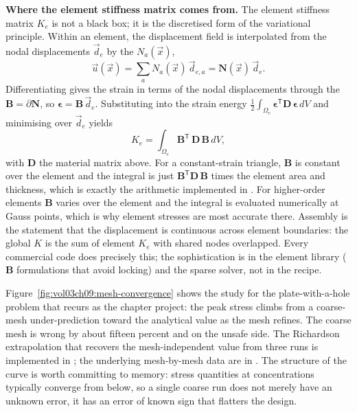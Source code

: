 \begin{mastery}
\textbf{Where the element stiffness matrix comes from.} The element
stiffness matrix $K_e$ is not a black box; it is the discretised form
of the variational principle. Within an element, the displacement field
is interpolated from the nodal displacements $\vec{d}_e$ by the
 $N_a(\vec{x})$,
\[
\vec{u}(\vec{x}) = \sum_a N_a(\vec{x})\,\vec{d}_{e,a}
= \mathbf{N}(\vec{x})\,\vec{d}_e .
\]
Differentiating gives the strain in terms of the nodal displacements
through the  $\mathbf{B} =
\partial \mathbf{N}$, so $\boldsymbol{\epsilon} = \mathbf{B}\,
\vec{d}_e$. Substituting into the strain energy
$\tfrac{1}{2}\int_{\Omega_e} \boldsymbol{\epsilon}^{\mathsf T}
\mathbf{D}\,\boldsymbol{\epsilon}\,dV$ and minimising over $\vec{d}_e$
yields
\[
K_e = \int_{\Omega_e} \mathbf{B}^{\mathsf T}\,\mathbf{D}\,\mathbf{B}
\,dV ,
\]
with $\mathbf{D}$ the material matrix above. For a constant-strain
triangle, $\mathbf{B}$ is constant over the element and the integral is
just $\mathbf{B}^{\mathsf T}\mathbf{D}\,\mathbf{B}$ times the element
area and thickness, which is exactly the arithmetic implemented in
. For higher-order elements $\mathbf{B}$
varies over the element and the integral is evaluated numerically at
Gauss points, which is why element stresses are most accurate there.
Assembly is the statement that the displacement is continuous across
element boundaries: the global $K$ is the sum of element $K_e$ with
shared nodes overlapped. Every commercial code does precisely this; the
sophistication is in the element library ($\mathbf{B}$ formulations
that avoid locking) and the sparse solver, not in the recipe.
\end{mastery}



Figure~\ref{fig:vol03ch09:mesh-convergence} shows the study for the
plate-with-a-hole problem that recurs as the chapter project: the peak
stress climbs from a coarse-mesh under-prediction toward the
analytical value as the mesh refines. The coarse mesh is wrong by
about fifteen percent and on the unsafe side. The Richardson
extrapolation that recovers the mesh-independent value from three runs
is implemented in ; the
underlying mesh-by-mesh data are in
. The structure of the curve is
worth committing to memory: stress quantities at concentrations
typically converge from below, so a single coarse run does not merely
have an unknown error, it has an error of known sign that flatters the
design.

